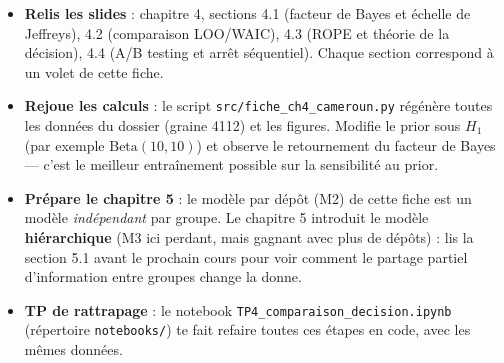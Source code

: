 \documentclass[11pt,a4paper]{article}
\begin{document}
\begin{contexte}
\begin{itemize}[leftmargin=4mm, itemsep=1mm]
  \item \textbf{Relis les slides} : chapitre 4, sections 4.1 (facteur de
        Bayes et échelle de Jeffreys), 4.2 (comparaison LOO/WAIC),
        4.3 (ROPE et théorie de la décision), 4.4 (A/B testing et arrêt
        séquentiel). Chaque section correspond à un volet de cette fiche.
  \item \textbf{Rejoue les calculs} : le script \texttt{src/fiche\_ch4\_cameroun.py}
        régénère toutes les données du dossier (graine 4112) et les figures.
        Modifie le prior sous $H_1$ (par exemple $\text{Beta}(10, 10)$) et
        observe le retournement du facteur de Bayes --- c'est le meilleur
        entraînement possible sur la sensibilité au prior.
  \item \textbf{Prépare le chapitre 5} : le modèle par dépôt (M2) de cette
        fiche est un modèle \emph{indépendant} par groupe. Le chapitre 5
        introduit le modèle \textbf{hiérarchique} (M3 ici perdant, mais
        gagnant avec plus de dépôts) : lis la section 5.1 avant le prochain
        cours pour voir comment le partage partiel d'information entre
        groupes change la donne.
  \item \textbf{TP de rattrapage} : le notebook \texttt{TP4\_comparaison\_decision.ipynb}
        (répertoire \texttt{notebooks/}) te fait refaire toutes ces étapes en
        code, avec les mêmes données.
\end{itemize}
\end{contexte}
\end{document}
